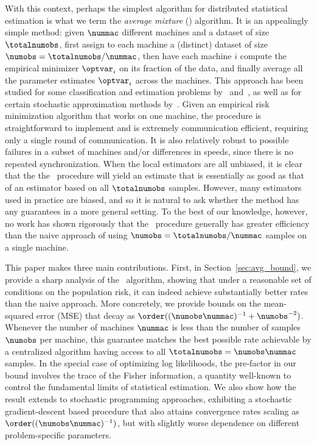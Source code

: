 \documentclass[11pt,twoside]{article}
\theoremstyle{definition}
\begin{document}
With this context, perhaps the simplest algorithm for distributed
statistical estimation is what we term the \emph{average mixture}
(\avgm) algorithm.  It is an appealingly simple method: given
$\nummac$ different machines and a dataset of size $\totalnumobs$,
first assign to each machine a (distinct) dataset of size $\numobs =
\totalnumobs / \nummac$, then have each machine $i$ compute the
empirical minimizer $\optvar_i$ on its fraction of the data, and
finally average all the parameter estimates $\optvar_i$ across the
machines.  This approach has been studied for some classification and
estimation problems by~\citet{MannMcMoSiWa09}
and~\citet{McDonaldHaMa2010}, as well as for certain stochastic
approximation methods by~\citet{ZinkevichSmWeLi10}. Given an empirical
risk minimization algorithm that works on one machine, the procedure
is straightforward to implement and is extremely communication
efficient, requiring only a single round of communication. It is also
relatively robust to possible failures in a subset of machines and/or
differences in speeds, since there is no repeated synchronization.
When the local estimators are all unbiased, it is clear that the the
\avgm\ procedure will yield an estimate that is essentially as good as
that of an estimator based on all $\totalnumobs$ samples.  However,
many estimators used in practice are biased, and so it is natural to
ask whether the method has any guarantees in a more general setting.
To the best of our knowledge, however, no work has shown rigorously
that the \avgm\ procedure generally has greater
efficiency than the naive approach of using $\numobs = \totalnumobs /
\nummac$ samples on a single machine.

This paper makes three main contributions.  First, in
Section~\ref{sec:avg_bound}, we provide a sharp analysis of the
\avgm\ algorithm, showing that under a reasonable set of conditions on
the population risk, it can indeed achieve substantially better rates
than the naive approach.  More concretely, we provide bounds on the
mean-squared error (MSE) that decay as \mbox{$\order((\numobs
  \nummac)^{-1} + \numobs^{-2})$.}  Whenever the number of machines
$\nummac$ is less than the number of samples $\numobs$ per machine,
this guarantee matches the best possible rate achievable by a
centralized algorithm having access to all $\totalnumobs = \numobs
\nummac$ samples.  In the special case of optimizing log likelihoods,
the pre-factor in our bound involves the trace of the Fisher
information, a quantity well-known to control the fundamental limits
of statistical estimation. We also show how the result extends to
stochastic programming approaches, exhibiting a stochastic
gradient-descent based procedure that also attains convergence rates
scaling as $\order((\numobs \nummac)^{-1})$, but with slightly worse
dependence on different problem-specific parameters. 
\end{document}
